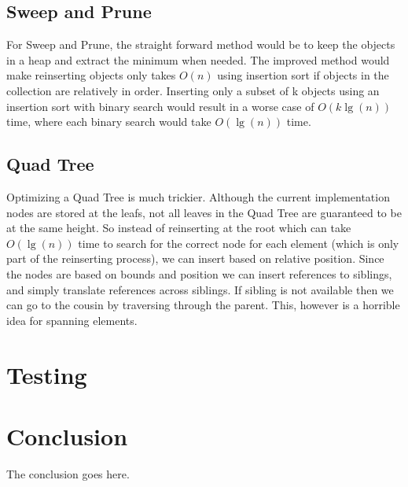 \documentclass[conference]{IEEEtran}
\begin{document}
\subsection{Sweep and Prune}

For Sweep and Prune, the straight forward method would be to keep the objects in a heap and extract the minimum when needed. The improved method would make reinserting objects only takes $O(n)$ using insertion sort if objects in the collection are relatively in order. Inserting only a subset of k objects using an insertion sort with binary search would result in a worse case of $O(k\lg(n))$ time, where each binary search would take $O(\lg(n))$ time.

\subsection{Quad Tree}
Optimizing a Quad Tree is much trickier. Although the current implementation nodes are stored at the leafs, not all leaves in the Quad Tree are guaranteed to be at the same height. So instead of reinserting at the root which can take $O(\lg(n))$ time to search for the correct node for each element (which is only part of the reinserting process), we can insert based on relative position. Since the nodes are based on bounds and position we can insert references to siblings, and simply translate references across siblings. If sibling is not available then we can go to the cousin by traversing through the parent. This, however is a horrible idea for spanning elements.

\section{Testing}

\section{Conclusion}
The conclusion goes here.
\end{document}
